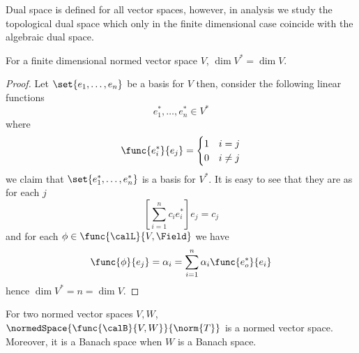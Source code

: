 \begin{remark}
    Dual space is defined for all vector spaces, however, in analysis we study the topological dual space which only in the finite dimensional case coincide with the algebraic dual space.
\end{remark}

\begin{proposition}
    For a finite dimensional normed vector space \(V\), \(\dim V^\ast = \dim V\).
\end{proposition}

\begin{proof}
    Let \(\set{e_1, \dots , e_n}\) be a basis for \(V\) then, consider the following linear functions
    \begin{equation*}
        e^\ast_1, \dots , e^\ast_n \in V^\ast
    \end{equation*}
    where
    \begin{equation*}
        \func{e^\ast_i}{e_j} = \begin{cases}
            1 & i = j    \\
            0 & i \neq j
        \end{cases}
    \end{equation*}
    we claim that \(\set{e^\ast_1, \dots , e^\ast_n}\) is a basis for \(V^\ast\). It is easy to see that they are as for each \(j\)
    \begin{equation*}
        \left[\sum_{i = 1}^n c_i e^\ast_i\right] e_j = c_j
    \end{equation*}
    and for each \(\phi \in \func{\calL}{V,\Field}\) we have
    \begin{equation*}
        \func{\phi}{e_j} = \alpha_i =  \sum_{i = 1}^n \alpha_i \func{e^\ast_o}{e_i}\\
    \end{equation*}
    hence \(\dim V^\ast = n = \dim V\).
\end{proof}

\begin{theorem}
    For two normed vector spaces \(V,W\), \(\normedSpace{\func{\calB}{V,W}}{\norm{T}}\) is a normed vector space. Moreover, it is a Banach space when \(W\) is a Banach space.
\end{theorem}


